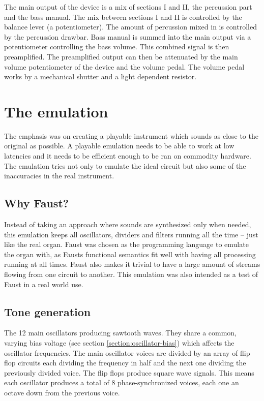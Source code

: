 \documentclass[11pt,a4paper]{article}
\begin{document}
The main output of the device is a mix of sections I and II, the percussion part and the bass manual. The mix between sections I and II is controlled by the balance lever (a potentiometer). The amount of percussion mixed in is controlled by the percussion drawbar. Bass manual is summed into the main output via a potentiometer controlling the bass volume. This combined signal is then preamplified. The preamplified output can then be attenuated by the main volume potentiometer of the device and the volume pedal. The volume pedal works by a mechanical shutter and a light dependent resistor.

\section{The emulation} 

The emphasis was on creating a playable instrument which sounds as close to the original as possible. A playable emulation needs to be able to work at low latencies and it needs to be efficient enough to be ran on commodity hardware. The emulation tries not only to emulate the ideal circuit but also some of the inaccuracies in the real instrument. 

\subsection{Why Faust?}

Instead of taking an approach where sounds are synthesized only when needed, this emulation keeps all oscillators, dividers and filters running all the time -- just like the real organ. Faust was chosen as the programming language to emulate the organ with, as Fausts functional semantics fit well with having all processing running at all times. Faust also makes it trivial to have a large amount of streams flowing from one circuit to another. This emulation was also intended as a test of Faust in a real world use.

\subsection{Tone generation}
\label{section:tone-generation}

The 12 main oscillators producing sawtooth waves. They share a common, varying bias voltage (see section \ref{section:oscillator-bias}) which affects the oscillator frequencies. The main oscillator voices are divided by an array of flip flop circuits each dividing the frequency in half and the next one dividing the previously divided voice. The flip flops produce square wave signals. This means each oscillator produces a total of  8 phase-synchronized voices, each one an octave down from the previous voice.
\end{document}
